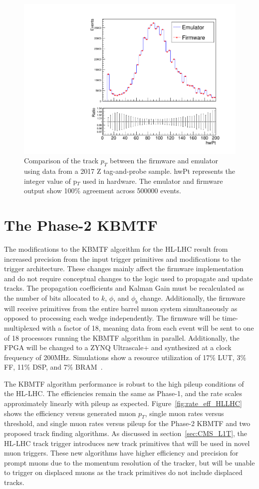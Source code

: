 \begin{figure}[htb!]
	\centering
	\includegraphics[width=0.55\linewidth]{figs/04_muons/emuVsFw_pt.pdf}
	\caption[Comparison of the track $p_T$ between the firmware and emulator using data from a 2017 Z tag-and-probe sample. hwPt represents the integer value of p$_T$ used in hardware. The emulator and firmware output show 100\% agreement across 500000 events.]{Comparison of the track $p_T$ between the firmware and emulator using data from a 2017 Z tag-and-probe sample. hwPt represents the integer value of p$_T$ used in hardware. The emulator and firmware output show 100\% agreement across 500000 events.}
	\label{fig:kmtf_fwVsEmu}
\end{figure}

\section{The Phase-2 KBMTF} \label{sec:HL_KBMTF}
The modifications to the KBMTF algorithm for the HL-LHC result from increased precision from the input trigger primitives and modifications to the trigger architecture. These changes mainly affect the firmware implementation and do not require conceptual changes to the logic used to propagate and update tracks. The propagation coefficients and Kalman Gain must be recalculated as the number of bits allocated to $k$, $\phi$, and $\phi_b$ change. Additionally, the firmware will receive primitives from the entire barrel muon system simultaneously as opposed to processing each wedge independently. The firmware will be time-multiplexed with a factor of 18, meaning data from each event will be sent to one of 18 processors running the KBMTF algorithm in parallel. Additionally, the FPGA will be changed to a ZYNQ Ultrascale+ and synthesized at a clock frequency of 200\unit{MHz}. Simulations show a resource utilization of 17\% LUT, 3\% FF, 11\% DSP, and 7\% BRAM~\cite{CERN-LHCC-2020-004}.

The KBMTF algorithm performance is robust to the high pileup conditions of the HL-LHC. The efficiencies remain the same as Phase-1, and the rate scales approximately linearly with pileup as expected. Figure~\ref{fig:rate_eff_HLLHC} shows the efficiency versus generated muon $p_T$, single muon rates versus threshold, and single muon rates versus pileup for the Phase-2 KBMTF and two proposed track finding algorithms. As discussed in section~\ref{sec:CMS_L1T}, the HL-LHC track trigger introduces new track primitives that will be used in novel muon triggers. These new algorithms have higher efficiency and precision for prompt muons due to the momentum resolution of the tracker, but will be unable to trigger on displaced muons as the track primitives do not include displaced tracks. 

